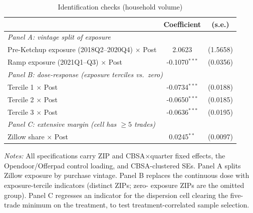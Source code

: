 \begin{table}[!htbp]\centering
\caption{Identification checks (household volume)}
\label{tab:T7}
\begin{tabular}{lcc}
\toprule
& Coefficient & (s.e.)\\
\midrule
\multicolumn{3}{l}{\emph{Panel A: vintage split of exposure}}\\
Pre-Ketchup exposure (2018Q2--2020Q4) $\times$ Post & 2.0623 & (1.5658)\\
Ramp exposure (2021Q1--Q3) $\times$ Post & -0.1070$^{***}$ & (0.0356)\\
\midrule
\multicolumn{3}{l}{\emph{Panel B: dose-response (exposure terciles vs.\ zero)}}\\
Tercile 1 $\times$ Post & -0.0734$^{***}$ & (0.0188)\\
Tercile 2 $\times$ Post & -0.0650$^{***}$ & (0.0185)\\
Tercile 3 $\times$ Post & -0.0636$^{***}$ & (0.0195)\\
\midrule
\multicolumn{3}{l}{\emph{Panel C: extensive margin (cell has $\geq 5$ trades)}}\\
Zillow share $\times$ Post & 0.0245$^{**}$ & (0.0097)\\
\bottomrule
\end{tabular}
\begin{minipage}{0.9\linewidth}\footnotesize\vspace{2pt}
\emph{Notes:} All specifications carry ZIP and CBSA$\times$quarter fixed
effects, the Opendoor/Offerpad control loading, and CBSA-clustered SEs.
Panel A splits Zillow exposure by purchase vintage. Panel B replaces the
continuous dose with exposure-tercile indicators (distinct ZIPs; zero-
exposure ZIPs are the omitted group). Panel C regresses an indicator for
the dispersion cell clearing the five-trade minimum on the treatment, to
test treatment-correlated sample selection.
\end{minipage}
\end{table}
